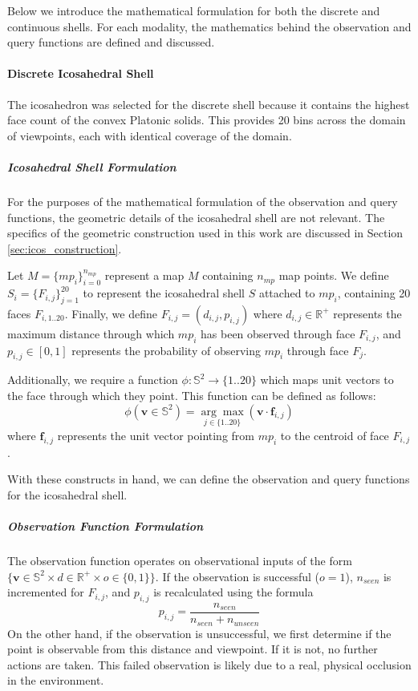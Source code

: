 Below we introduce the mathematical formulation for both the discrete and continuous shells. For each modality, the mathematics behind the observation and query functions are defined and discussed.

\paragraph{Discrete Icosahedral Shell}

The icosahedron was selected for the discrete shell because it contains the highest face count of the convex Platonic solids. This provides 20 bins across the domain of viewpoints, each with identical coverage of the domain.

\subparagraph{Icosahedral Shell Formulation}

For the purposes of the mathematical formulation of the observation and query functions, the geometric details of the icosahedral shell are not relevant. The specifics of the geometric construction used in this work are discussed in Section \ref{sec:icos_construction}.

Let $M=\{mp_i\}_{i=0}^{n_{mp}}$ represent a map $M$ containing $n_{mp}$ map points. We define $S_i=\{F_{i,j}\}_{j=1}^{20}$ to represent the icosahedral shell $S$ attached to $mp_i$, containing 20 faces $F_{i,{1..20}}$. Finally, we define $F_{i,j}=(d_{i,j}, p_{i,j})$ where $d_{i,j}\in\mathbb{R}^+$ represents the maximum distance through which $mp_i$ has been observed through face $F_{i,j}$, and $p_{i,j}\in[0,1]$ represents the probability of observing $mp_i$ through face $F_j$.

Additionally, we require a function $\phi:\mathbb{S}^2\rightarrow\{1..20\}$ which maps unit vectors to the face through which they point. This function can be defined as follows:
$$
    \phi(\mathbf{v}\in\mathbb{S}^2) = \underset{j\in\{1..20\}}{\arg\max}(\mathbf{v} \cdot \boldsymbol{f}_{i,j})
$$
where $\boldsymbol{f}_{i,j}$ represents the unit vector pointing from $mp_i$ to the centroid of face $F_{i,j}$.

With these constructs in hand, we can define the observation and query functions for the icosahedral shell.

\subparagraph{Observation Function Formulation}

The observation function operates on observational inputs of the form $\{\boldsymbol{v}\in\mathbb{S}^2\times d\in\mathbb{R}^+\times o\in\{0, 1\}\}$. If the observation is successful ($o = 1$), $n_{seen}$ is incremented for $F_{i,j}$, and $p_{i,j}$ is recalculated using the formula
$$
    p_{i,j}=\frac{n_{seen}}{n_{seen}+n_{unseen}}
$$
On the other hand, if the observation is unsuccessful, we first determine if the point is observable from this distance and viewpoint. If it is not, no further actions are taken. This failed observation is likely due to a real, physical occlusion in the environment.

